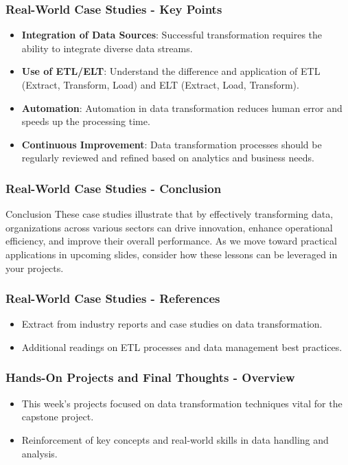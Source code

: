 \documentclass[aspectratio=169]{beamer}
\begin{document}
\begin{frame}[fragile]
    \frametitle{Real-World Case Studies - Key Points}
    \begin{itemize}
        \item \textbf{Integration of Data Sources}: Successful transformation requires the ability to integrate diverse data streams.
        \item \textbf{Use of ETL/ELT}: Understand the difference and application of ETL (Extract, Transform, Load) and ELT (Extract, Load, Transform).
        \item \textbf{Automation}: Automation in data transformation reduces human error and speeds up the processing time.
        \item \textbf{Continuous Improvement}: Data transformation processes should be regularly reviewed and refined based on analytics and business needs.
    \end{itemize}
\end{frame}

\begin{frame}[fragile]
    \frametitle{Real-World Case Studies - Conclusion}
    \begin{block}{Conclusion}
        These case studies illustrate that by effectively transforming data, organizations across various sectors can drive innovation, enhance operational efficiency, and improve their overall performance. As we move toward practical applications in upcoming slides, consider how these lessons can be leveraged in your projects.
    \end{block}
\end{frame}

\begin{frame}[fragile]
    \frametitle{Real-World Case Studies - References}
    \begin{itemize}
        \item Extract from industry reports and case studies on data transformation.
        \item Additional readings on ETL processes and data management best practices.
    \end{itemize}
\end{frame}

\begin{frame}[fragile]
    \frametitle{Hands-On Projects and Final Thoughts - Overview}
    \begin{itemize}
        \item This week's projects focused on data transformation techniques vital for the capstone project.
        \item Reinforcement of key concepts and real-world skills in data handling and analysis.
    \end{itemize}
\end{frame}
\end{document}
